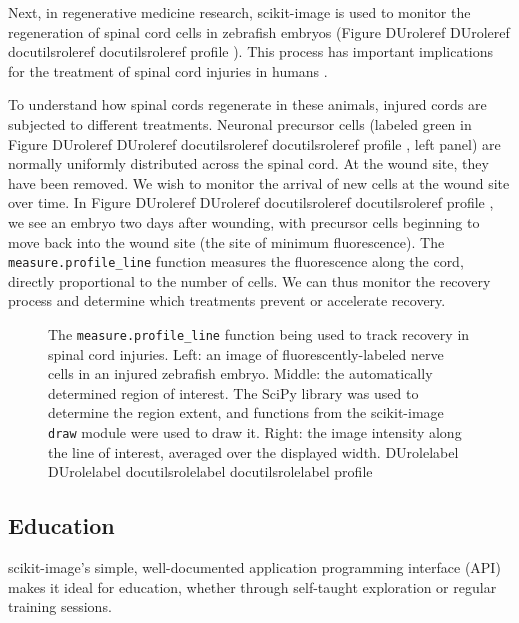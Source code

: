 \documentclass[fleqn,12pt]{wlpeerj}
\providecommand*{\DUrole}[2]{%
  \ifcsname DUrole#1\endcsname%
    \csname DUrole#1\endcsname{#2}%
  \else%
    \ifcsname docutilsrole#1\endcsname%
      \csname docutilsrole#1\endcsname{#2}%
    \else%
      #2%
    \fi%
  \fi%
}
\begin{document}
Next, in regenerative medicine research, scikit-image is used to monitor the
regeneration of spinal cord cells in zebrafish embryos (Figure \DUrole{ref}{profile}).
This process has important implications for the treatment of spinal cord
injuries in humans \citep{Bhatt04,Thuret06}.

To understand how spinal cords regenerate in these animals, injured cords are
subjected to different treatments. Neuronal precursor cells (labeled green in Figure \DUrole{ref}{profile}, left panel) are
normally uniformly distributed across the spinal cord. At the wound site, they
have been removed. We wish to monitor the arrival of new cells at the
wound site over time. In Figure \DUrole{ref}{profile}, we see an embryo two days after
wounding, with precursor cells beginning to move back into the wound site (the site of
minimum fluorescence). The \texttt{measure.profile\_line} function measures the
fluorescence along the cord, directly proportional to the number of cells. We
can thus monitor the recovery process and determine which treatments prevent or
accelerate recovery.\begin{figure}[bht]\noindent{}
\caption{The \texttt{measure.profile\_line} function being used to track recovery in spinal
cord injuries. Left: an image of fluorescently-labeled nerve cells in an
injured zebrafish embryo. Middle: the automatically determined region of
interest. The SciPy library was used to determine the region extent, and
functions from the scikit-image \texttt{draw} module were used to draw it. Right:
the image intensity along the line of interest, averaged over the displayed
width.
\DUrole{label}{profile}}
\end{figure}

\subsection*{Education}
  \label{education}

scikit-image's simple, well-documented application programming interface (API)
makes it ideal for education, whether through self-taught exploration or
regular training sessions.
\end{document}
